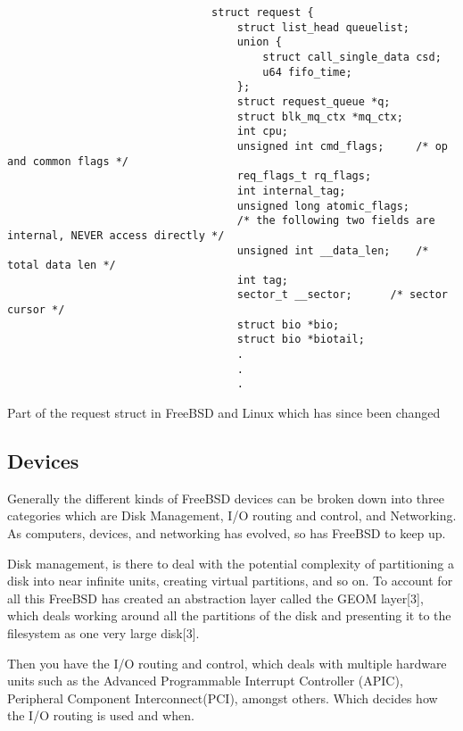 \documentclass{article}
\begin{document}
                                    \begin{lstlisting}
                                struct request {
                                	struct list_head queuelist;
                                	union {
                                		struct call_single_data csd;
                                		u64 fifo_time;
                                	};
                                	struct request_queue *q;
                                	struct blk_mq_ctx *mq_ctx;
                                	int cpu;
                                	unsigned int cmd_flags;		/* op and common flags */
                                	req_flags_t rq_flags;
                                	int internal_tag;
                                	unsigned long atomic_flags;
                                	/* the following two fields are internal, NEVER access directly */
                                	unsigned int __data_len;	/* total data len */
                                	int tag;
                                	sector_t __sector;		/* sector cursor */
                                	struct bio *bio;
                                	struct bio *biotail;
                                	.
                                	.
                                	.

                                \end{lstlisting}
                         Part of the request struct in FreeBSD and Linux which has since been changed \newline


\subsection{Devices}
    Generally the different kinds of FreeBSD devices can be broken down into three categories which are Disk Management, I/O routing and control, and Networking. As computers, devices, and networking has evolved, so has FreeBSD to keep up.

    Disk management, is there to deal with the potential complexity of partitioning a disk into near infinite units, creating virtual partitions, and so on. To account for all this FreeBSD has created an abstraction layer called the GEOM layer[3], which deals working around all the partitions of the disk and presenting it to the filesystem as one very large disk[3].

    Then you have the I/O routing and control, which deals with multiple hardware units such as the Advanced Programmable Interrupt Controller (APIC), Peripheral Component Interconnect(PCI), amongst others. Which decides how the I/O routing is used and when.
\end{document}
